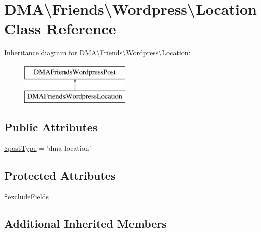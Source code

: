 \hypertarget{classDMA_1_1Friends_1_1Wordpress_1_1Location}{\section{D\+M\+A\textbackslash{}Friends\textbackslash{}Wordpress\textbackslash{}Location Class Reference}
\label{classDMA_1_1Friends_1_1Wordpress_1_1Location}
}
Inheritance diagram for D\+M\+A\textbackslash{}Friends\textbackslash{}Wordpress\textbackslash{}Location\+:\begin{figure}[H]
\begin{center}
\leavevmode
\includegraphics[height=2.000000cm]{d3/d8d/classDMA_1_1Friends_1_1Wordpress_1_1Location}
\end{center}
\end{figure}
\subsection*{Public Attributes}
\begin{DoxyCompactItemize}
\item 
\hyperlink{classDMA_1_1Friends_1_1Wordpress_1_1Location_a40f4ecf15a53d860bfbba3484f2999bf}{\$post\+Type} = 'dma-\/location'
\end{DoxyCompactItemize}
\subsection*{Protected Attributes}
\begin{DoxyCompactItemize}
\item 
\hyperlink{classDMA_1_1Friends_1_1Wordpress_1_1Location_ae18a475210d12a42d335d6ca6fb47811}{\$exclude\+Fields}
\end{DoxyCompactItemize}
\subsection*{Additional Inherited Members}


